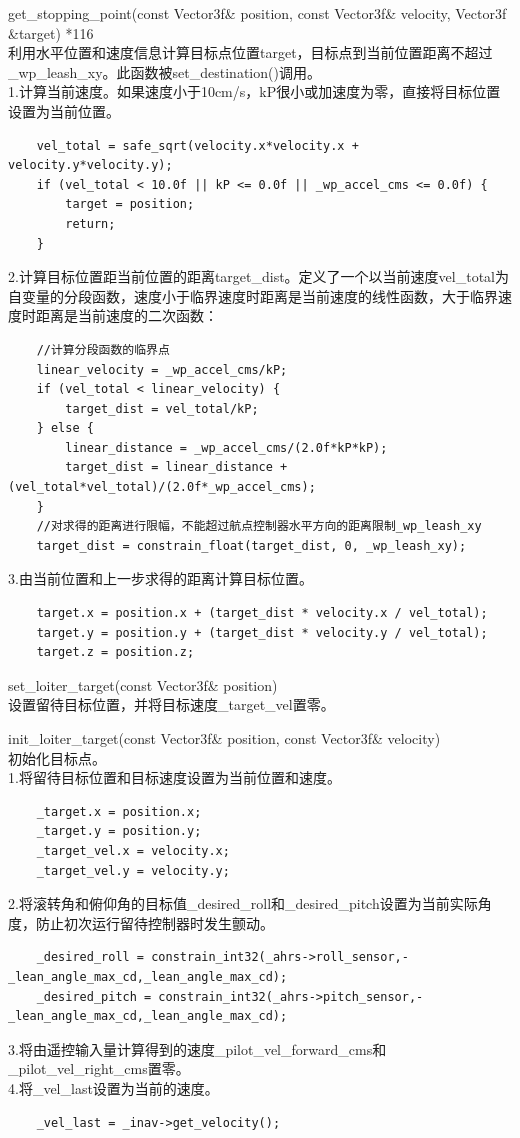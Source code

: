 \documentclass[a4paper,10pt]{ctexart} %
\begin{document}
\noindent get\_stopping\_point(const Vector3f\& position, const Vector3f\& velocity, Vector3f \&target) {\color{red}*116}\\
利用水平位置和速度信息计算目标点位置target，目标点到当前位置距离不超过\_wp\_leash\_xy。此函数被set\_destination()调用。\\
1.计算当前速度。如果速度小于10cm/s，kP很小或加速度为零，直接将目标位置设置为当前位置。
\begin{lstlisting}
    vel_total = safe_sqrt(velocity.x*velocity.x + velocity.y*velocity.y);
    if (vel_total < 10.0f || kP <= 0.0f || _wp_accel_cms <= 0.0f) {
        target = position;
        return;
    }
\end{lstlisting}
2.计算目标位置距当前位置的距离target\_dist。定义了一个以当前速度vel\_total为自变量的分段函数，速度小于临界速度时距离是当前速度的线性函数，大于临界速度时距离是当前速度的二次函数：
\begin{lstlisting}
    //计算分段函数的临界点
    linear_velocity = _wp_accel_cms/kP;
    if (vel_total < linear_velocity) {
        target_dist = vel_total/kP;
    } else {
        linear_distance = _wp_accel_cms/(2.0f*kP*kP);
        target_dist = linear_distance + (vel_total*vel_total)/(2.0f*_wp_accel_cms);
    }
    //对求得的距离进行限幅，不能超过航点控制器水平方向的距离限制_wp_leash_xy
    target_dist = constrain_float(target_dist, 0, _wp_leash_xy);
\end{lstlisting}
3.由当前位置和上一步求得的距离计算目标位置。
\begin{lstlisting}
    target.x = position.x + (target_dist * velocity.x / vel_total);
    target.y = position.y + (target_dist * velocity.y / vel_total);
    target.z = position.z;
\end{lstlisting}


\vspace{8pt}
\noindent set\_loiter\_target(const Vector3f\& position)\\
设置留待目标位置，并将目标速度\_target\_vel置零。

\vspace{8pt}
\noindent init\_loiter\_target(const Vector3f\& position, const Vector3f\& velocity)\\
初始化目标点。\\
1.将留待目标位置和目标速度设置为当前位置和速度。
\begin{lstlisting}
    _target.x = position.x;
    _target.y = position.y;
    _target_vel.x = velocity.x;
    _target_vel.y = velocity.y;
\end{lstlisting}
2.将滚转角和俯仰角的目标值\_desired\_roll和\_desired\_pitch设置为当前实际角度，防止初次运行留待控制器时发生颤动。
\begin{lstlisting}
    _desired_roll = constrain_int32(_ahrs->roll_sensor,-_lean_angle_max_cd,_lean_angle_max_cd);
    _desired_pitch = constrain_int32(_ahrs->pitch_sensor,-_lean_angle_max_cd,_lean_angle_max_cd);
\end{lstlisting}
3.将由遥控输入量计算得到的速度\_pilot\_vel\_forward\_cms和\_pilot\_vel\_right\_cms置零。\\
4.将\_vel\_last设置为当前的速度。
\begin{lstlisting}
    _vel_last = _inav->get_velocity();	
\end{lstlisting}
\end{document}
